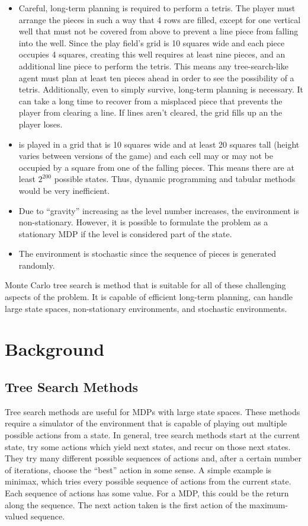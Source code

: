 \documentclass[letterpaper]{article} %
\begin{document}
\begin{itemize}
  \item{
        Careful, long-term planning is required to perform a tetris. The player must arrange the pieces in such a way that 4 rows are
        filled, except for one vertical well that must not be covered from above to prevent a line piece from falling into the well. Since the play field's grid is 10 squares wide and each piece occupies 4 squares, creating this well requires at least
        nine pieces, and an additional line piece to perform the tetris. This means any tree-search-like agent must plan at least ten pieces ahead in order to see the possibility of a tetris. Additionally, even to simply survive, long-term planning is
        necessary. It can take a long time to recover from a misplaced piece that prevents the player from clearing a line. If lines aren't cleared, the grid fills up an the player loses.
        }
  \item{
        \tetris{} is played in a grid that is 10 squares wide and at least 20 squares tall (height varies between versions of the game) and each cell may or may not be occupied by a square from one of the falling pieces. This means there are at least \(2^{200}\)
        possible states. Thus, dynamic programming and tabular methods would be very inefficient.
        }
  \item{
        Due to ``gravity'' increasing as the level number increases, the environment is non-stationary. However, it is possible to formulate the problem as a stationary MDP if the level is considered part of the state.
        }
  \item{
        The environment is stochastic since the sequence of pieces is generated randomly.
        }
\end{itemize}

Monte Carlo tree search is method that is suitable for all of these challenging aspects of the problem. It is capable of efficient long-term planning, can handle large state spaces, non-stationary environments, and stochastic environments.

\section{Background}

\subsection{Tree Search Methods}
Tree search methods are useful for MDPs with large state spaces. These methods require a simulator of the environment that is capable of playing out multiple possible actions from a state. In general, tree search methods start at the current state,
try some actions which yield next states, and recur on those next states. They try many different possible sequences of actions and, after a certain number of iterations, choose the ``best'' action in some sense. A simple example
is minimax, which tries every possible sequence of actions from the current state. Each sequence of actions has some value. For a MDP, this could be the return along the sequence. The next action taken is the first action of the maximum-valued sequence.
\end{document}
